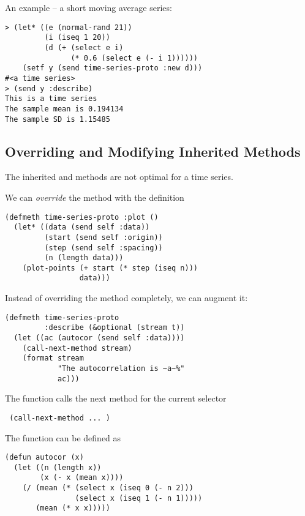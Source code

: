 \begin{slide}{}
An example -- a short moving average series:
{\Large
\begin{verbatim}
> (let* ((e (normal-rand 21))
         (i (iseq 1 20))
         (d (+ (select e i)
               (* 0.6 (select e (- i 1))))))
    (setf y (send time-series-proto :new d)))
#<a time series>
> (send y :describe)
This is a time series
The sample mean is 0.194134
The sample SD is 1.15485
\end{verbatim}}
\end{slide}

\begin{slide}{}
\subsection{Overriding and Modifying Inherited Methods}
The inherited  and  methods are not
optimal for a time series.

We can {\em override}\/ the  method with the definition
{\Large
\begin{verbatim}
(defmeth time-series-proto :plot ()
  (let* ((data (send self :data))
         (start (send self :origin))
         (step (send self :spacing))
         (n (length data)))
    (plot-points (+ start (* step (iseq n)))
                 data)))
\end{verbatim}}
\end{slide}

\begin{slide}{}
Instead of overriding the  method completely,
we can augment it:
{\Large
\begin{verbatim}
(defmeth time-series-proto
         :describe (&optional (stream t))
  (let ((ac (autocor (send self :data))))
    (call-next-method stream)
    (format stream
            "The autocorrelation is ~a~%"
            ac)))
\end{verbatim}}
The  function calls the next method for the
current selector
\begin{flushleft}\Large\tt
(call-next-method  ... )
\end{flushleft}
The  function can be defined as
{\Large
\begin{verbatim}
(defun autocor (x)
  (let ((n (length x))
        (x (- x (mean x))))
    (/ (mean (* (select x (iseq 0 (- n 2))) 
                (select x (iseq 1 (- n 1)))))
       (mean (* x x)))))
\end{verbatim}}
\end{slide}

